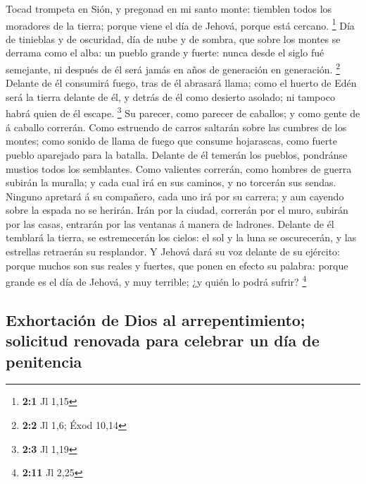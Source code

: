  Tocad trompeta en Sión, y pregonad en mi santo monte:
tiemblen todos los moradores de la tierra; porque viene el día de
Jehová, porque está cercano. \footnote{\textbf{2:1} Jl 1,15}
 Día de tinieblas y de oscuridad, día de nube y de sombra,
que sobre los montes se derrama como el alba: un pueblo grande y fuerte:
nunca desde el siglo fué semejante, ni después de él será jamás en años
de generación en generación. \footnote{\textbf{2:2} Jl 1,6; Éxod 10,14}
 Delante de él consumirá fuego, tras de él abrasará llama;
como el huerto de Edén será la tierra delante de él, y detrás de él como
desierto asolado; ni tampoco habrá quien de él escape. \footnote{\textbf{2:3}
  Jl 1,19}  Su parecer, como parecer de caballos; y como
gente de á caballo correrán.  Como estruendo de carros
saltarán sobre las cumbres de los montes; como sonido de llama de fuego
que consume hojarascas, como fuerte pueblo aparejado para la batalla.
 Delante de él temerán los pueblos, pondránse mustios todos
los semblantes.  Como valientes correrán, como hombres de
guerra subirán la muralla; y cada cual irá en sus caminos, y no torcerán
sus sendas.  Ninguno apretará á su compañero, cada uno irá
por su carrera; y aun cayendo sobre la espada no se herirán.
 Irán por la ciudad, correrán por el muro, subirán por las
casas, entrarán por las ventanas á manera de ladrones. 
Delante de él temblará la tierra, se estremecerán los cielos: el sol y
la luna se oscurecerán, y las estrellas retraerán su resplandor.
 Y Jehová dará su voz delante de su ejército: porque muchos
son sus reales y fuertes, que ponen en efecto su palabra: porque grande
es el día de Jehová, y muy terrible; ¿y quién lo podrá sufrir?
\footnote{\textbf{2:11} Jl 2,25}

\hypertarget{exhortaciuxf3n-de-dios-al-arrepentimiento-solicitud-renovada-para-celebrar-un-duxeda-de-penitencia}{%
\subsection{Exhortación de Dios al arrepentimiento; solicitud renovada
para celebrar un día de
penitencia}\label{exhortaciuxf3n-de-dios-al-arrepentimiento-solicitud-renovada-para-celebrar-un-duxeda-de-penitencia}}

